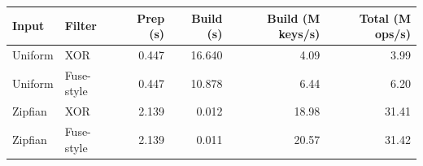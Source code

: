 \begin{tabular}{@{}llrrrr@{}}
\toprule
\textbf{Input} & \textbf{Filter} & \textbf{Prep (s)} & \textbf{Build (s)} & \textbf{Build (M keys/s)} & \textbf{Total (M ops/s)} \\
\midrule
Uniform & XOR & 0.447 & 16.640 & 4.09 & 3.99 \\
Uniform & Fuse-style & 0.447 & 10.878 & 6.44 & 6.20 \\
Zipfian & XOR & 2.139 & 0.012 & 18.98 & 31.41 \\
Zipfian & Fuse-style & 2.139 & 0.011 & 20.57 & 31.42 \\
\bottomrule
\end{tabular}
